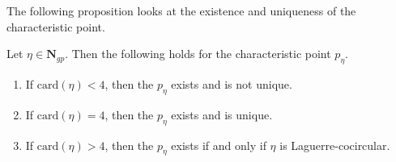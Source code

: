 The following proposition looks at the existence and uniqueness of the characteristic point.

\begin{proposition}\label{prop:charpoint}
	Let $\eta\in \mathbf N_{gp}$. Then the following holds for the characteristic point $p_\eta$.
	\begin{enumerate}
		\item If $\mathrm{card}(\eta)<4$, then the $p_\eta$ exists and is not unique.
		\item If $\mathrm{card}(\eta)=4$, then the $p_\eta$ exists and is unique.
		\item If $\mathrm{card}(\eta)>4$, then the $p_\eta$ exists if and only if $\eta$ is Laguerre-cocircular.
	\end{enumerate}
\end{proposition}
